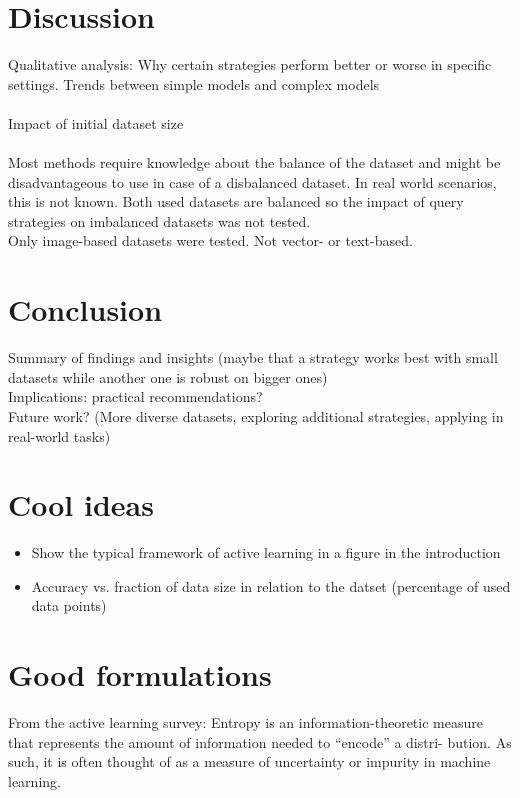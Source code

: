 \documentclass{article}
\theoremstyle{plain}
\theoremstyle{definition}
\theoremstyle{remark}
\begin{document}
\section{Discussion}\label{sec:discussion}
Qualitative analysis: Why certain strategies perform better or worse in specific settings. Trends between simple models and complex models
\\
\\
Impact of initial dataset size
\\
\\
Most methods require knowledge about the balance of the dataset and might be disadvantageous to use in case of a disbalanced dataset. In real world scenarios, this is not known. Both used datasets are balanced so the impact of query strategies on imbalanced datasets was not tested. \\
Only image-based datasets were tested. Not vector- or text-based. 

\section{Conclusion}\label{sec:conclusion}
Summary of findings and insights (maybe that a strategy works best with small datasets while another one is robust on bigger ones)
\\
Implications: practical recommendations?
\\
Future work? (More diverse datasets, exploring additional strategies, applying in real-world tasks)

\newpage

\section{Cool ideas}
\begin{itemize}
	\item Show the typical framework of active learning in a figure in the introduction
	\item Accuracy vs. fraction of data size in relation to the datset (percentage of used data points)
\end{itemize}

\section{Good formulations}
From the active learning survey: Entropy is an information-theoretic
measure that represents the amount of information needed to “encode” a distri-
bution. As such, it is often thought of as a measure of uncertainty or impurity in machine learning.
\end{document}

